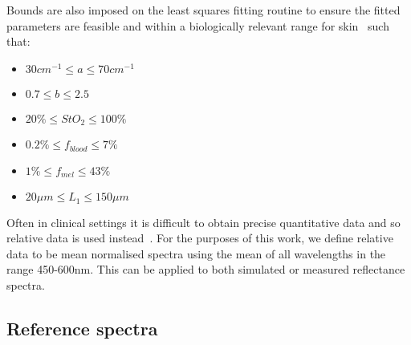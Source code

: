 Bounds are also imposed on the least squares fitting routine to ensure the fitted parameters are feasible and within a biologically relevant range for skin~\citep{Yudovsky2009, Jacques2013} such that:
\begin{itemize}
    \item $30cm^{-1} \leq a \leq 70cm^{-1}$
    \item $0.7 \leq b \leq 2.5$
    \item $20\% \leq StO_2 \leq 100\%$
    \item $0.2\% \leq f_{blood} \leq 7\% $
    \item $1\% \leq f_{mel} \leq 43\%$
    \item $20{\mu}m \leq L_1 \leq 150{\mu}m$
\end{itemize}
Often in clinical settings it is difficult to obtain precise quantitative data and so relative data is used instead~\citep{Bahl2023}. For the
purposes of this work, we define relative data to be mean normalised spectra using the mean of all wavelengths in the range 450-600nm. This can be applied to both simulated or measured reflectance spectra. 
%

\subsection{Reference spectra}\label{sec:methodreference2}
